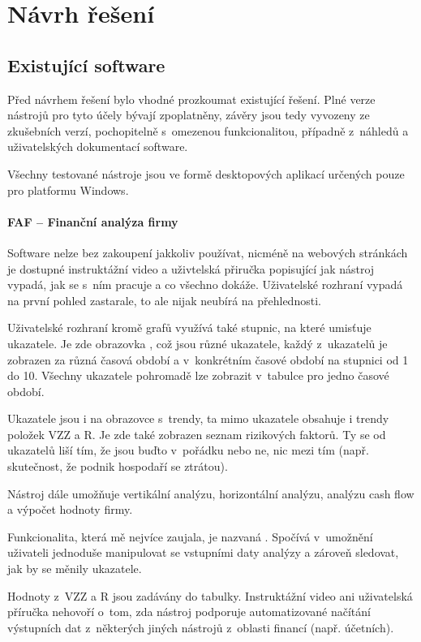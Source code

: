 \chapter{Návrh řešení}



\section{Existující software}
Před návrhem řešení bylo vhodné prozkoumat existující řešení. Plné verze nástrojů pro tyto účely bývají zpoplatněny, závěry jsou tedy vyvozeny ze zkušebních verzí, pochopitelně s~omezenou funkcionalitou, případně z~náhledů a uživatelských dokumentací software.

Všechny testované nástroje jsou ve formě desktopových aplikací určených pouze pro platformu Windows.

\subsubsection{FAF -- Finanční analýza firmy}
Software nelze bez zakoupení jakkoliv používat, nicméně na webových stránkách je dostupné instruktážní video a uživtelská přiručka popisující jak nástroj vypadá, jak se s~ním pracuje a co všechno dokáže. Uživatelské rozhraní vypadá na první pohled zastarale, to ale nijak neubírá na přehlednosti.

Uživatelské rozhraní kromě grafů využívá také stupnic, na které umisťuje ukazatele. Je zde obrazovka , což jsou různé ukazatele, každý z~ukazatelů je zobrazen za různá časová období a v~konkrétním časové období na stupnici od 1 do 10. Všechny ukazatele pohromadě lze zobrazit v~tabulce pro jedno časové období.

Ukazatele jsou i na obrazovce s~trendy, ta mimo ukazatele obsahuje i trendy položek VZZ a R. Je zde také zobrazen seznam rizikových faktorů. Ty se od ukazatelů liší tím, že jsou buďto v~pořádku nebo ne, nic mezi tím (např. skutečnost, že podnik hospodaří se ztrátou).

Nástroj dále umožňuje vertikální analýzu, horizontální analýzu, analýzu cash flow a výpočet hodnoty firmy.

Funkcionalita, která mě nejvíce zaujala, je nazvaná . Spočívá v~umožnění uživateli jednoduše manipulovat se vstupními daty analýzy a zároveň sledovat, jak by se měnily ukazatele.

Hodnoty z~VZZ a R jsou zadávány do tabulky. Instruktážní video ani uživatelská příručka nehovoří o~tom, zda nástroj podporuje automatizované načítání výstupních dat z~některých jiných nástrojů z~oblasti financí (např. účetních).

